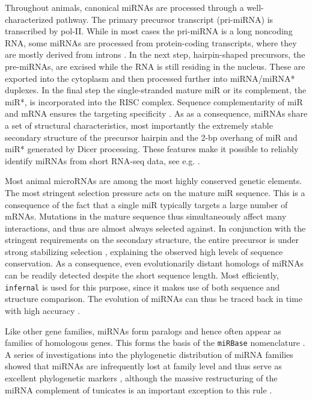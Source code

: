 \documentclass[graybox]{svmult}
\begin{document}
Throughout animals, canonical miRNAs are processed through a
well-characterized pathway. The primary precursor transcript (pri-miRNA) is
transcribed by pol-II. While in most cases the pri-miRNA is a long
noncoding RNA, some miRNAs are processed from protein-coding transcripts,
where they are mostly derived from introns \cite{Lin:06}. In the next step,
hairpin-shaped precursors, the pre-miRNAs, are excised while the RNA is
still residing in the nucleus. These are exported into the cytoplasm
\cite{Lund:04} and then processed further into miRNA/miRNA* duplexes. In
the final step the single-stranded mature miR or its complement, the miR*,
is incorporated into the RISC complex. Sequence complementarity of miR and mRNA
ensures the targeting specificity \cite{Bartel:13}. As as a consequence,
miRNAs share a set of structural characteristics, most importantly the
extremely stable secondary structure of the precursor hairpin and the 2-bp
overhang of miR and miR* generated by Dicer processing. These features make
it possible to reliably identify miRNAs from short RNA-seq data, see e.g.
\cite{Langenberger:10a, Friedlaender:12, Langenberger:13a}.

Most animal microRNAs are among the most highly conserved genetic elements.
The most stringent selection pressure acts on the mature miR sequence. This
is a consequence of the fact that a single miR typically targets a large
number of mRNAs. Mutations in the mature sequence thus simultaneously affect
many interactions, and thus are almost always selected against. In
conjunction with the stringent requirements on the secondary structure, the
entire precursor is under strong stabilizing selection \cite{Price:11},
explaining the observed high levels of sequence conservation. As a
consequence, even evolutionarily distant homologs of miRNAs can be readily
detected despite the short sequence length. Most efficiently,
\texttt{infernal} \cite{Nawrocki:13} is used for this purpose, since it
makes use of both sequence and structure comparison. The evolution of
miRNAs can thus be traced back in time with high accuracy \cite{Hertel:06a}. 

Like other gene families, miRNAs form paralogs \cite{Tanzer:04a, Hertel:12a}
and hence often appear as families of homologous genes. This forms the
basis of the \texttt{miRBase} nomenclature \cite{Ambrose:03a}. A series of
investigations into the phylogenetic distribution of miRNA families showed
that miRNAs are infrequently lost at family level and thus serve as
excellent phylogenetic markers \cite{Sempere:06, Heimberg:08, Heimberg:10, 
Wheeler:09}, although the massive restructuring of the miRNA complement of 
tunicates is an important exception to this rule \cite{Fu:08}.
\end{document}
